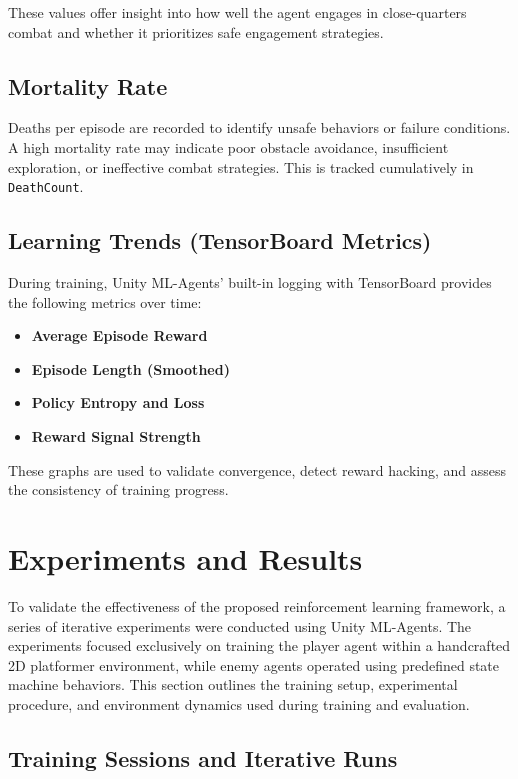 \documentclass[12pt,oneside,openright,a4paper]{cpe-english-project}
\begin{document}
These values offer insight into how well the agent engages in close-quarters combat and whether it prioritizes safe engagement strategies.

\subsection{Mortality Rate}
Deaths per episode are recorded to identify unsafe behaviors or failure conditions. A high mortality rate may indicate poor obstacle avoidance, insufficient exploration, or ineffective combat strategies. This is tracked cumulatively in \texttt{DeathCount}.

\subsection{Learning Trends (TensorBoard Metrics)}

During training, Unity ML-Agents’ built-in logging with TensorBoard provides the following metrics over time:

\begin{itemize}
\item \textbf{Average Episode Reward}
\item \textbf{Episode Length (Smoothed)}
\item \textbf{Policy Entropy and Loss}
\item \textbf{Reward Signal Strength}
\end{itemize}

These graphs are used to validate convergence, detect reward hacking, and assess the consistency of training progress.

\section{Experiments and Results}

To validate the effectiveness of the proposed reinforcement learning framework, a series of iterative experiments were conducted using Unity ML-Agents. The experiments focused exclusively on training the player agent within a handcrafted 2D platformer environment, while enemy agents operated using predefined state machine behaviors. This section outlines the training setup, experimental procedure, and environment dynamics used during training and evaluation.

\subsection{Training Sessions and Iterative Runs}
\end{document}
